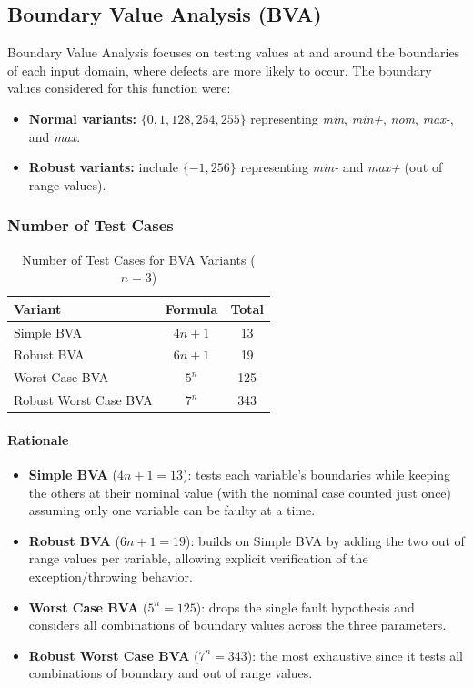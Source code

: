 \documentclass[11pt, a4paper]{article}
\begin{document}
\subsection{Boundary Value Analysis (BVA)}
Boundary Value Analysis focuses on testing values at and around the boundaries of each input domain, where defects are more likely to occur. The boundary values considered for this function were:
\begin{itemize}
    \item \textbf{Normal variants:} $\{0, 1, 128, 254, 255\}$ representing \textit{min}, \textit{min+}, \textit{nom}, \textit{max-}, and \textit{max}.
    \item \textbf{Robust variants:} include $\{-1, 256\}$ representing \textit{min-} and \textit{max+} (out of range values).
\end{itemize}

\subsubsection{Number of Test Cases}
\begin{table}[H]
\centering
\caption{Number of Test Cases for BVA Variants ($n = 3$)}
\label{tab:bva_summary}
\begin{tabular}{lcc}
\toprule
\textbf{Variant} & \textbf{Formula} & \textbf{Total} \\
\midrule
Simple BVA              & $4n + 1$ & 13  \\
Robust BVA              & $6n + 1$ & 19  \\
Worst Case BVA          & $5^n$    & 125 \\
Robust Worst Case BVA   & $7^n$    & 343 \\
\bottomrule
\end{tabular}
\end{table}

\paragraph{Rationale}
\begin{itemize}
    \item \textbf{Simple BVA} ($4n+1 = 13$): tests each variable’s boundaries while keeping the others at their nominal value (with the nominal case counted just once) assuming only one variable can be faulty at a time.
    \item \textbf{Robust BVA} ($6n+1 = 19$): builds on Simple BVA by adding the two out of range values per variable, allowing explicit verification of the exception/throwing behavior.
    \item \textbf{Worst Case BVA} ($5^n = 125$): drops the single fault hypothesis and considers all combinations of boundary values across the three parameters.
    \item \textbf{Robust Worst Case BVA} ($7^n = 343$): the most exhaustive since it tests all combinations of boundary and out of range values.
\end{itemize}
\end{document}
